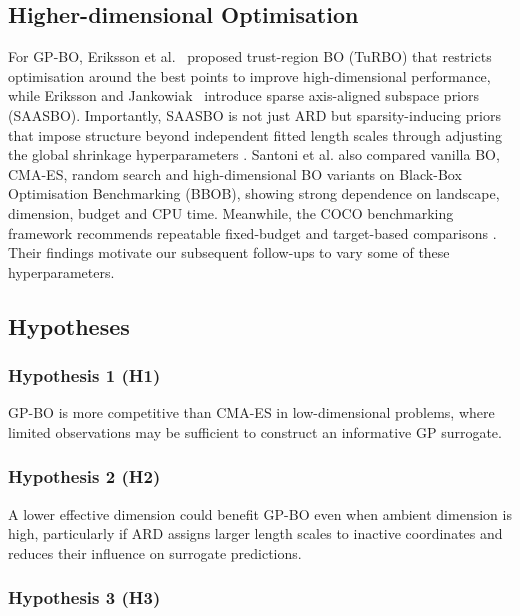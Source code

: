 \documentclass[11pt]{article}
\begin{document}
\subsection{Higher-dimensional Optimisation}

\noindent For GP-BO, Eriksson et al.~\cite{eriksson2020scalable} proposed trust-region BO (TuRBO) that restricts optimisation around the best points to improve high-dimensional performance, while Eriksson and Jankowiak~\cite{eriksson2021highdimensional} introduce sparse axis-aligned subspace priors (SAASBO). Importantly, SAASBO is not just ARD but sparsity-inducing priors that impose structure beyond independent fitted length scales through adjusting the global shrinkage hyperparameters \cite{eriksson2021highdimensional}. Santoni et al. \cite{santoni2024comparison} also compared vanilla BO, CMA-ES, random search and high-dimensional BO variants on Black-Box Optimisation Benchmarking (BBOB), showing strong dependence on landscape, dimension, budget and CPU time. Meanwhile, the COCO benchmarking framework recommends repeatable fixed-budget and target-based comparisons \cite{hansen2021coco}. Their findings motivate our subsequent follow-ups to vary some of these hyperparameters.

\subsection{Hypotheses}

\subsubsection*{Hypothesis 1 (H1)}

GP-BO is more competitive than CMA-ES in low-dimensional problems, where limited observations may be sufficient to construct an informative GP surrogate.

\subsubsection*{Hypothesis 2 (H2)}

A lower effective dimension could benefit GP-BO even when ambient dimension is high, particularly if ARD assigns larger length scales to inactive coordinates and reduces their influence on surrogate predictions.

\subsubsection*{Hypothesis 3 (H3)}
\end{document}
